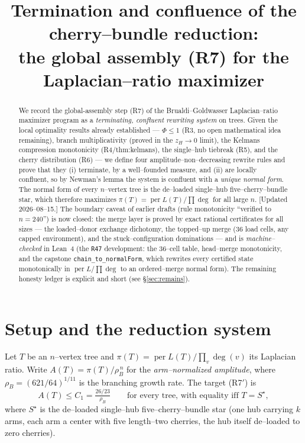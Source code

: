 \documentclass[11pt]{article}
\title{Termination and confluence of the cherry--bundle reduction:\\
the global assembly (R7) for the Laplacian--ratio maximizer}
\author{}
\date{}
\newcommand{\pit}{\pi}
\newcommand{\rhoB}{\rho_B}
\begin{document}
\maketitle

\begin{abstract}
We record the global-assembly step (R7) of the Brualdi--Goldwasser Laplacian--ratio maximizer program as a
\emph{terminating, confluent rewriting system} on trees. Given the local optimality results already
established --- $\Phi\le 1$ (R3, no open mathematical idea remaining), branch multiplicativity (proved in the
$z_H\to0$ limit), the Kelmans compression monotonicity (R4/thm:kelmans), the single--hub tiebreak (R5), and
the cherry distribution (R6) --- we define four amplitude--non--decreasing rewrite rules and prove that they
(i) terminate, by a well--founded measure, and (ii) are locally confluent, so by Newman's lemma the system is
confluent with a \emph{unique normal form}. The normal form of every $n$--vertex tree is the de--loaded
single--hub five--cherry--bundle star, which therefore maximizes $\pit(T)=\operatorname{per}L(T)/\prod\deg$
for all large $n$. [Updated 2026--08--15.] The boundary caveat of earlier drafts (rule monotonicity ``verified to
$n=240$'') is now closed: the merge layer is proved by exact rational certificates for all sizes ---
the loaded--donor exchange dichotomy, the topped--up merge (36 load cells, any capped environment),
and the stuck--configuration dominations --- and is \emph{machine--checked} in Lean~4 (the
\texttt{R47} development: the 36--cell table, head--merge monotonicity, and the capstone
\texttt{chain\_to\_normalForm}, which rewrites every certified state monotonically in
$\operatorname{per}L/\prod\deg$ to an ordered--merge normal form). The remaining honesty ledger is
explicit and short (see \S\ref{sec:remains}).
\end{abstract}

\section{Setup and the reduction system}

Let $T$ be an $n$--vertex tree and $\pit(T)=\operatorname{per}L(T)/\prod_v\deg(v)$ its Laplacian ratio.
Write $A(T)=\pit(T)/\rhoB^{\,n}$ for the \emph{arm--normalized amplitude}, where $\rhoB=(621/64)^{1/11}$ is the
branching growth rate. The target (R7$'$) is
\begin{equation}\label{eq:target}
  A(T)\le C_1=\tfrac{26/23}{\rhoB}\qquad\text{for every tree, with equality iff }T=S^\star,
\end{equation}
where $S^\star$ is the de--loaded single--hub five--cherry--bundle star (one hub carrying $k$ arms, each arm a
center with five length--two cherries, the hub itself de--loaded to zero cherries).
\end{document}
